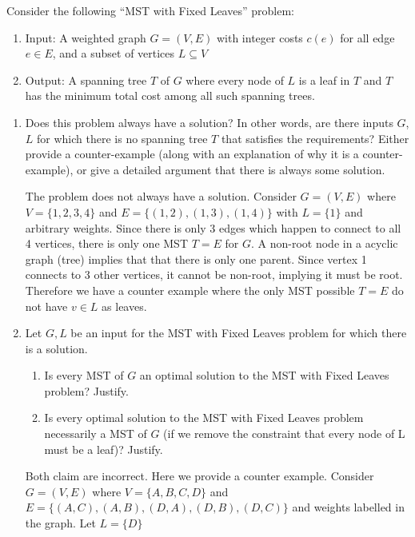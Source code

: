 \documentclass[11pt]{article}
\begin{document}
Consider the following “MST with Fixed Leaves” problem:
\begin{enumerate}
    \item Input: A weighted graph $G=(V,E)$ with integer costs $c(e)$ for all edge $e\in E$, and a subset of vertices $L\subseteq V$
    \item Output: A spanning tree $T$ of $G$ where every node of $L$ is a leaf in $T$ and $T$ has the minimum total cost among all such spanning trees.
\end{enumerate}


\begin{enumerate}
    \item Does this problem always have a solution? In other words, are there inputs $G$, $L$ for which there is no spanning tree $T$ that satisfies the requirements? Either provide a counter-example (along with an explanation of why it is a counter-example), or give a detailed argument that there is always some solution.

    \begin{solution}
        The problem does not always have a solution. Consider $G = (V, E)$ where $V = \{ 1, 2, 3, 4\}$ and $E = \{ (1,2), (1,3), (1,4) \}$ with $L = \{ 1 \}$ and arbitrary weights. Since there is only 3 edges which happen to connect to all 4 vertices, there is only one MST $T = E$ for $G$. A non-root node in a acyclic graph (tree) implies that that there is only one parent. Since vertex 1 connects to 3 other vertices, it cannot be non-root, implying it must be root. Therefore we have a counter example where the only MST possible $T=E$ do not have $v\in L$ as leaves.
    \end{solution}


    \item  Let $G,L$ be an input for the MST with Fixed Leaves problem for which there is a solution.
    \begin{enumerate}
        \item Is every MST of $G$ an optimal solution to the MST with Fixed Leaves problem? Justify.
        \item Is every optimal solution to the MST with Fixed Leaves problem necessarily a MST of $G$  (if we remove the constraint that every node of L must be a leaf)? Justify.
    \end{enumerate}
    \begin{solution}
        Both claim are incorrect. Here we provide a counter example. Consider $G = (V,E)$ where $V = \{ A, B, C, D\}$ and $E = \{ (A,C), (A,B), (D,A), (D,B), (D,C) \}$ and weights labelled in the graph. Let $L = \{ D \}$
        \begin{center}
\end{center}
\end{solution}
\end{enumerate}
\end{document}
